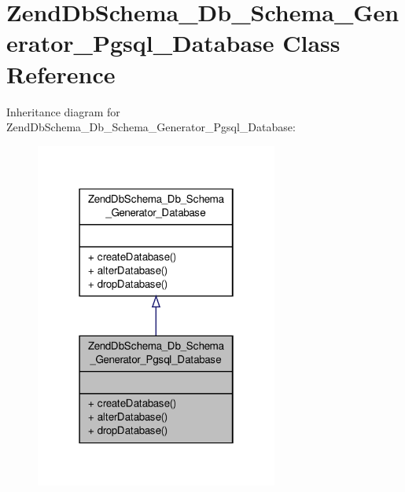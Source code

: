 \hypertarget{classZendDbSchema__Db__Schema__Generator__Pgsql__Database}{\section{Zend\-Db\-Schema\-\_\-\-Db\-\_\-\-Schema\-\_\-\-Generator\-\_\-\-Pgsql\-\_\-\-Database Class Reference}
\label{classZendDbSchema__Db__Schema__Generator__Pgsql__Database}
}


Inheritance diagram for Zend\-Db\-Schema\-\_\-\-Db\-\_\-\-Schema\-\_\-\-Generator\-\_\-\-Pgsql\-\_\-\-Database\-:\nopagebreak
\begin{figure}[H]
\begin{center}
\leavevmode
\includegraphics[width=226pt]{classZendDbSchema__Db__Schema__Generator__Pgsql__Database__inherit__graph}
\end{center}
\end{figure}


